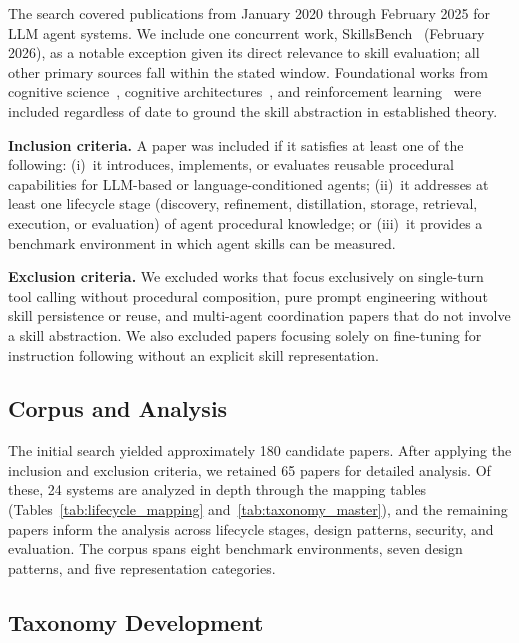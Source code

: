 \documentclass[conference, compsoc]{IEEEtran}
\theoremstyle{plain}
\newcommand{\para}[1]{\smallskip\noindent\textbf{#1.}}
\begin{document}
The search covered publications from January 2020 through February 2025 for LLM agent systems. We include one concurrent work, SkillsBench~\cite{skillsbench2025} (February 2026), as a notable exception given its direct relevance to skill evaluation; all other primary sources fall within the stated window. Foundational works from cognitive science~\cite{anderson2004actr,chase1973chess}, cognitive architectures~\cite{laird2012soar}, and reinforcement learning~\cite{sutton1999options} were included regardless of date to ground the skill abstraction in established theory.

\para{Inclusion criteria} A paper was included if it satisfies at least one of the following: (i)~it introduces, implements, or evaluates reusable procedural capabilities for LLM-based or language-conditioned agents; (ii)~it addresses at least one lifecycle stage (discovery, refinement, distillation, storage, retrieval, execution, or evaluation) of agent procedural knowledge; or (iii)~it provides a benchmark environment in which agent skills can be measured.

\para{Exclusion criteria} We excluded works that focus exclusively on single-turn tool calling without procedural composition, pure prompt engineering without skill persistence or reuse, and multi-agent coordination papers that do not involve a skill abstraction. We also excluded papers focusing solely on fine-tuning for instruction following without an explicit skill representation.

\subsection{Corpus and Analysis}
\label{sec:methodology:corpus}

The initial search yielded approximately 180 candidate papers. After applying the inclusion and exclusion criteria, we retained 65 papers for detailed analysis. Of these, 24 systems are analyzed in depth through the mapping tables (Tables~\ref{tab:lifecycle_mapping} and~\ref{tab:taxonomy_master}), and the remaining papers inform the analysis across lifecycle stages, design patterns, security, and evaluation. The corpus spans eight benchmark environments, seven design patterns, and five representation categories.

\subsection{Taxonomy Development}
\label{sec:methodology:taxonomy}
\end{document}
